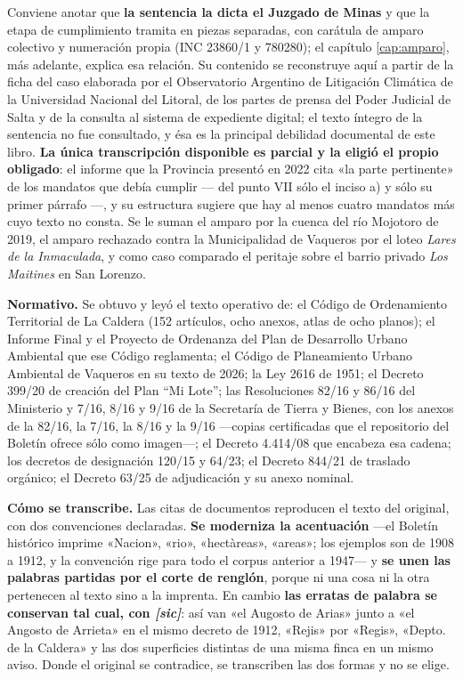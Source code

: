 Conviene anotar que \textbf{la sentencia la dicta el Juzgado de Minas} y que la etapa de cumplimiento tramita en piezas separadas, con carátula de amparo colectivo y numeración propia (INC 23860/1 y 780280); el capítulo \ref{cap:amparo}, más adelante, explica esa relación. Su contenido se reconstruye aquí a partir de la ficha del caso elaborada por el Observatorio Argentino de Litigación Climática de la Universidad Nacional del Litoral, de los partes de prensa del Poder Judicial de Salta y de la consulta al sistema de expediente digital; el texto íntegro de la sentencia no fue consultado, y ésa es la principal debilidad documental de este libro. \textbf{La única transcripción disponible es parcial y la eligió el propio obligado}: el informe que la Provincia presentó en 2022 cita «la parte pertinente» de los mandatos que debía cumplir --- del punto VII sólo el inciso a) y sólo su primer párrafo ---, y su estructura sugiere que hay al menos cuatro mandatos más cuyo texto no consta. Se le suman el amparo por la cuenca del río Mojotoro de 2019, el amparo rechazado contra la Municipalidad de Vaqueros por el loteo \textit{Lares de la Inmaculada}, y como caso comparado el peritaje sobre el barrio privado \textit{Los Maitines} en San Lorenzo.

\textbf{Normativo.} Se obtuvo y leyó el texto operativo de: el Código de Ordenamiento Territorial de La Caldera (152 artículos, ocho anexos, atlas de ocho planos); el Informe Final y el Proyecto de Ordenanza del Plan de Desarrollo Urbano Ambiental que ese Código reglamenta; el Código de Planeamiento Urbano Ambiental de Vaqueros en su texto de 2026; la Ley 2616 de 1951; el Decreto 399/20 de creación del Plan ``Mi Lote''; las Resoluciones 82/16 y 86/16 del Ministerio y 7/16, 8/16 y 9/16 de la Secretaría de Tierra y Bienes, con los anexos de la 82/16, la 7/16, la 8/16 y la 9/16 ---copias certificadas que el repositorio del Boletín ofrece sólo como imagen---; el Decreto 4.414/08 que encabeza esa cadena; los decretos de designación 120/15 y 64/23; el Decreto 844/21 de traslado orgánico; el Decreto 63/25 de adjudicación y su anexo nominal.

\textbf{Cómo se transcribe.} Las citas de documentos reproducen el texto del original, con dos
convenciones declaradas. \textbf{Se moderniza la acentuación} ---el Boletín histórico
imprime «Nacion», «rio», «hectàreas», «areas»; los ejemplos son de 1908 a 1912, y la
convención rige para todo el corpus anterior a 1947--- y \textbf{se unen las palabras partidas por el
corte de renglón}, porque ni una cosa ni la otra pertenecen al texto sino a la imprenta. En
cambio \textbf{las erratas de palabra se conservan tal cual, con \textit{[sic]}}: así van «el
Augosto de Arias» junto a «el Angosto de Arrieta» en el mismo decreto de 1912, «Rejis» por
«Regis», «Depto. de la Caldera» y las dos superficies distintas de una misma finca en un mismo
aviso. Donde el original se contradice, se transcriben las dos formas y no se elige.

